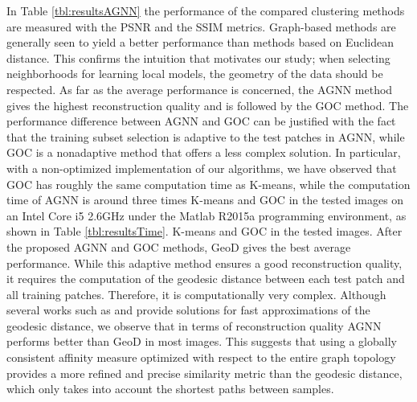 \documentclass[journal]{IEEEtran}
\begin{document}
In Table \ref{tbl:resultsAGNN} the performance of the compared clustering methods are measured with the PSNR and the SSIM metrics. Graph-based methods are generally seen to  yield a better performance than methods based on Euclidean distance. This confirms the intuition that motivates our study; when selecting neighborhoods for learning local models, the geometry of the data should be respected. As far as the average performance is concerned, the AGNN method gives the highest reconstruction quality and is followed by the GOC method. The performance difference between AGNN and GOC can be justified with the fact that the training subset selection is adaptive to the test patches in AGNN, while GOC is a nonadaptive method that offers a less complex solution. In particular, with a non-optimized implementation of our algorithms, we have observed that GOC has roughly the same computation time as K-means, while the computation time of AGNN is around three times K-means and GOC in the tested images on an Intel Core i5 2.6GHz under the Matlab R2015a programming environment, as shown in Table \ref{tbl:resultsTime}. K-means and GOC in the tested images. After the proposed AGNN and GOC methods, GeoD gives the best average performance. While this adaptive method ensures a good reconstruction quality, it requires the computation of the geodesic distance between each test patch and all training patches. Therefore, it is computationally very complex. Although several works such as \cite{Turaga10nearest} and \cite{Chaudhry10fast} provide solutions for fast approximations of the geodesic distance, we observe that in terms of reconstruction quality AGNN performs better than GeoD in most images. This suggests that using a globally consistent affinity measure optimized with respect to the entire graph topology provides a more refined and precise similarity metric than the geodesic distance, which only takes into account the shortest paths between samples.
\end{document}
